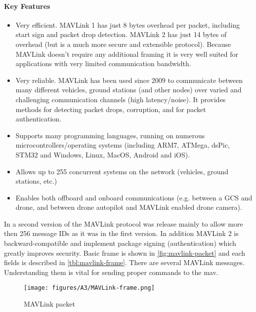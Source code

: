 \paragraph{Key Features} %
\label{par:key_features}
\begin{itemize}
	\item Very efficient. MAVLink 1 has just 8 bytes overhead per packet, including start sign and packet drop detection. MAVLink 2 has just 14 bytes of overhead (but is a much more secure and extensible protocol). Because MAVLink doesn't require any additional framing it is very well suited for applications with very limited communication bandwidth. 
	\item Very reliable. MAVLink has been used since 2009 to communicate between many different vehicles, ground stations (and other nodes) over varied and challenging communication channels (high latency/noise). It provides methods for detecting packet drops, corruption, and for packet authentication.
	\item Supports many programming languages, running on numerous microcontrollers/operating systems (including ARM7, ATMega, dsPic, STM32 and Windows, Linux, MacOS, Android and iOS).
	\item Allows up to 255 concurrent systems on the network (vehicles, ground stations, etc.)
	\item Enables both offboard and onboard communications (e.g. between a GCS and drone, and between drone autopilot and MAVLink enabled drone camera).
\end{itemize}
In  a second version of the MAVLink protocol was release mainly to allow more then 256 message IDs as it was in the first version. In addition MAVLink 2 is backward-compatible and implement package signing (authentication) which greatly improves security. Basic frame is shown in \autoref{fig:mavlink-packet} and each fields is described in \autoref{tbl:mavlink-frame}. There are several MAVLink messages. Understanding them is vital for sending proper commands to the mav.
\begin{figure}[ht]
    \centering
    \texttt{[image: figures/A3/MAVLink-frame.png]}
    \caption{MAVLink packet \cite{MavlinkSerialization}}
    \label{fig:mavlink-packet}
\end{figure}

